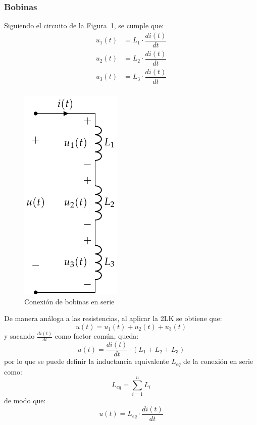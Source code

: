 \documentclass[11pt]{book} %
\begin{document}
		\subsubsection{Bobinas}
		Siguiendo el circuito de la Figura~\ref{fig.bobinas-serie}, se cumple que:
		\begin{align*}
			u_1(t) &= L_1 \cdot \dfrac{di(t)}{dt}\\
			u_2(t) &= L_2 \cdot \dfrac{di(t)}{dt}\\
			u_3(t) &= L_3 \cdot \dfrac{di(t)}{dt}\\
		\end{align*}
		\begin{figure}[htbp]
			\centering
			\includegraphics[width=0.2\linewidth]{../figs/BobinasSerie.pdf}
			\caption{Conexión de bobinas en serie}
			\label{fig.bobinas-serie}
		\end{figure}
		De manera análoga a las resistencias, al aplicar la 2LK se obtiene que: 
		\begin{equation*}
			u(t) = u_1(t) + u_2(t) + u_3(t)
		\end{equation*}
		y sacando $\frac{di(t)}{dt}$ como factor común, queda:
		\begin{equation*}
			u(t) = \dfrac{di(t)}{dt} \cdot (L_1 + L_2 + L_3)
		\end{equation*}
		por lo que se puede definir la inductancia equivalente $L_{eq}$ de la conexión en serie como:
		\begin{equation}
			\boxed{L_{eq} = \sum_{i = 1}^n L_i}
		\end{equation}
		de modo que:
		\begin{equation*}
			u(t) = L_{eq} \cdot \dfrac{di(t)}{dt}
		\end{equation*}
\end{document}
